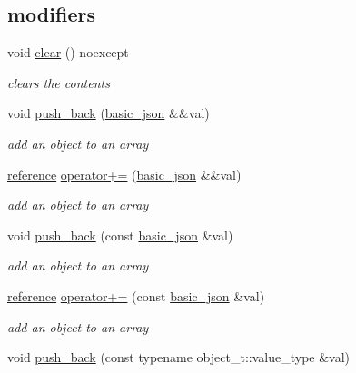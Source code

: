 \subsection*{modifiers}
\begin{DoxyCompactItemize}
\item 
void \mbox{\hyperlink{classnlohmann_1_1basic__json_abfeba47810ca72f2176419942c4e1952}{clear}} () noexcept
\begin{DoxyCompactList}\small\item\em clears the contents \end{DoxyCompactList}\item 
void \mbox{\hyperlink{classnlohmann_1_1basic__json_ac8e523ddc8c2dd7e5d2daf0d49a9c0d7}{push\+\_\+back}} (\mbox{\hyperlink{classnlohmann_1_1basic__json}{basic\+\_\+json}} \&\&val)
\begin{DoxyCompactList}\small\item\em add an object to an array \end{DoxyCompactList}\item 
\mbox{\hyperlink{classnlohmann_1_1basic__json_ac6a5eddd156c776ac75ff54cfe54a5bc}{reference}} \mbox{\hyperlink{classnlohmann_1_1basic__json_aea1085f2d35cc0e1ce119cf0110119e6}{operator+=}} (\mbox{\hyperlink{classnlohmann_1_1basic__json}{basic\+\_\+json}} \&\&val)
\begin{DoxyCompactList}\small\item\em add an object to an array \end{DoxyCompactList}\item 
void \mbox{\hyperlink{classnlohmann_1_1basic__json_ab4384af330b79de0e5f279576803a2c7}{push\+\_\+back}} (const \mbox{\hyperlink{classnlohmann_1_1basic__json}{basic\+\_\+json}} \&val)
\begin{DoxyCompactList}\small\item\em add an object to an array \end{DoxyCompactList}\item 
\mbox{\hyperlink{classnlohmann_1_1basic__json_ac6a5eddd156c776ac75ff54cfe54a5bc}{reference}} \mbox{\hyperlink{classnlohmann_1_1basic__json_adc29dd6358ff7a9062d7e168c24e7484}{operator+=}} (const \mbox{\hyperlink{classnlohmann_1_1basic__json}{basic\+\_\+json}} \&val)
\begin{DoxyCompactList}\small\item\em add an object to an array \end{DoxyCompactList}\item 
void \mbox{\hyperlink{classnlohmann_1_1basic__json_ae11a3a51782c058fff2f6550cdfb9b3c}{push\+\_\+back}} (const typename object\+\_\+t\+::value\+\_\+type \&val)

\end{DoxyCompactItemize}
